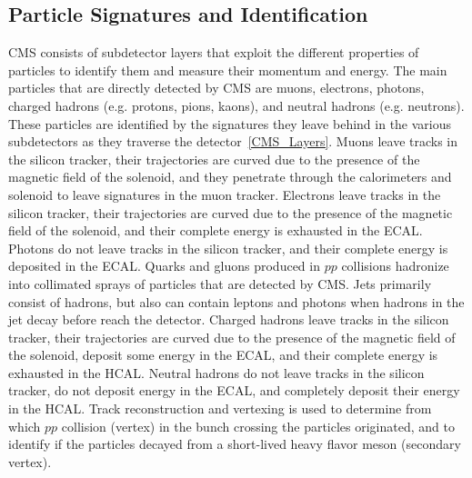 \subsection{Particle Signatures and Identification}
CMS consists of subdetector layers that exploit the different properties of particles to identify them and measure their momentum and energy.
The main particles that are directly detected by CMS are muons, electrons, photons, charged hadrons (e.g. protons, pions, kaons), and neutral hadrons (e.g. neutrons).
These particles are identified by the signatures they leave behind in the various subdetectors as they traverse the detector~\ref{CMS_Layers}.
Muons leave tracks in the silicon tracker, their trajectories are curved due to the presence of the magnetic field of the solenoid, and they penetrate through the calorimeters and solenoid to leave signatures in the muon tracker.
Electrons leave tracks in the silicon tracker, their trajectories are curved due to the presence of the magnetic field of the solenoid, and their complete energy is exhausted in the ECAL.
Photons do not leave tracks in the silicon tracker, and their complete energy is deposited in the ECAL.
Quarks and gluons produced in $pp$ collisions hadronize into collimated sprays of particles that are detected by CMS.
Jets primarily consist of hadrons, but also can contain leptons and photons when hadrons in the jet decay before reach the detector.
Charged hadrons leave tracks in the silicon tracker, their trajectories are curved due to the presence of the magnetic field of the solenoid, deposit some energy in the ECAL, and their complete energy is exhausted in the HCAL.
Neutral hadrons do not leave tracks in the silicon tracker, do not deposit energy in the ECAL, and completely deposit their energy in the HCAL.
Track reconstruction and vertexing is used to determine from which $pp$ collision (vertex) in the bunch crossing the particles originated, and to identify if the particles decayed from a short-lived heavy flavor meson (secondary vertex).
